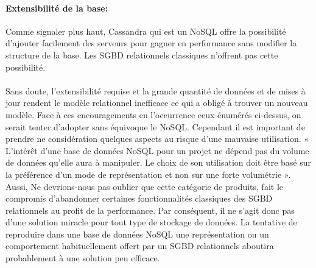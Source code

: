 \paragraph{Extensibilité de la base:} Comme signaler plus haut, 
\textsf{Cassandra} qui est un \textsf{NoSQL} offre la possibilité 
d'ajouter facilement des serveurs pour gagner en performance sans modifier 
la structure de la base. Les \textsf{SGBD} relationnels classiques 
n'offrent pas cette possibilité.
\\ 
\\ 
Sans doute, l'extensibilité requise et la grande quantité de données
et de mises à jour rendent le modèle relationnel inefficace ce qui a
obligé à trouver un nouveau modèle.  Face à ces encouragements en
l'occurrence ceux énumérés ci-dessus, on serait tenter d'adopter sans
équivoque le \textsf{NoSQL}. Cependant il est important de prendre ne
considération quelques aspects au risque d'une mauvaise utilisation. «
L’intérêt d’une base de données \textsf{NoSQL} pour un projet ne
dépend pas du volume de données qu’elle aura à manipuler. Le choix de
son utilisation doit être basé sur la préférence d’un mode de
représentation et non sur une forte volumétrie
»\cite{NoSQLeurope}. Aussi, Ne devrions-nous pas oublier que cette
catégorie de produits, fait le compromis d'abandonner certaines
fonctionnalités classiques des \textsf{SGBD} relationnels au profit de
la performance. Par conséquent, il ne s’agit donc pas d’une solution
miracle pour tout type de stockage de données.  La tentative de
reproduire dans une base de données \textsf{NoSQL} une représentation
ou un comportement habituellement offert par un \textsf{SGBD}
relationnels aboutira probablement à une solution peu efficace.
